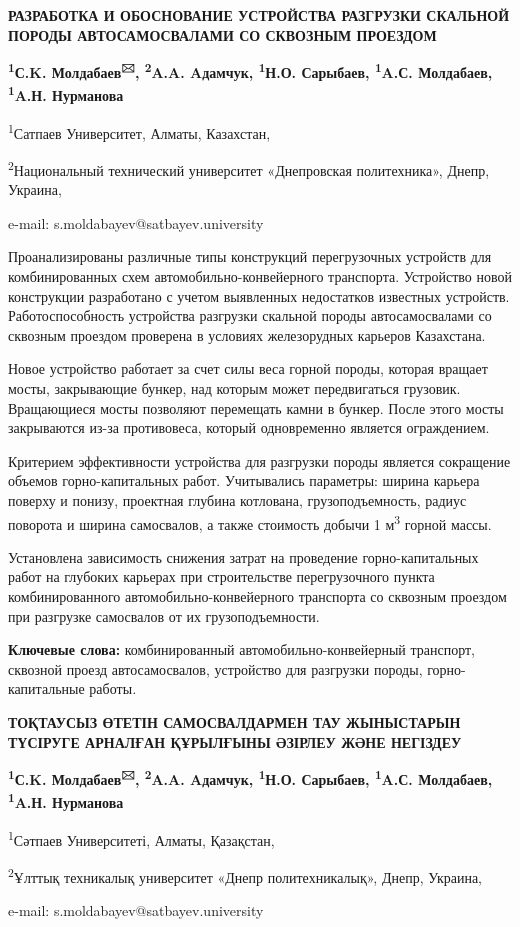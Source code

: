 \begin{center}
{\large\bfseries РАЗРАБОТКА И ОБОСНОВАНИЕ УСТРОЙСТВА РАЗГРУЗКИ СКАЛЬНОЙ ПОРОДЫ
АВТОСАМОСВАЛАМИ СО СКВОЗНЫМ ПРОЕЗДОМ}

{\bfseries \textsuperscript{1}С.K. Молдабаев\textsuperscript{🖂},
\textsuperscript{2}A.A. Aдамчук, \textsuperscript{1}Н.О. Сарыбаев,
\textsuperscript{1}A.С. Молдабаев, \textsuperscript{1}A.Н. Нурманова}

\textsuperscript{1}Сатпаев Университет, Алматы, Казахстан,

\textsuperscript{2}Национальный технический университет «Днепровская
политехника», Днепр, Украина,

e-mail: s.moldabayev@satbayev.university
\end{center}

Проанализированы различные типы конструкций перегрузочных устройств для
комбинированных схем автомобильно-конвейерного транспорта. Устройство
новой конструкции разработано с учетом выявленных недостатков известных
устройств. Работоспособность устройства разгрузки скальной породы
автосамосвалами со сквозным проездом проверена в условиях железорудных
карьеров Казахстана.

Новое устройство работает за счет силы веса горной породы, которая
вращает мосты, закрывающие бункер, над которым может передвигаться
грузовик. Вращающиеся мосты позволяют перемещать камни в бункер. После
этого мосты закрываются из-за противовеса, который одновременно является
ограждением.

Критерием эффективности устройства для разгрузки породы является
сокращение объемов горно-капитальных работ. Учитывались параметры:
ширина карьера поверху и понизу, проектная глубина котлована,
грузоподъемность, радиус поворота и ширина самосвалов, а также стоимость
добычи 1 м\textsuperscript{3} горной массы.

Установлена зависимость снижения затрат на проведение горно-капитальных
работ на глубоких карьерах при строительстве перегрузочного пункта
комбинированного автомобильно-конвейерного транспорта со сквозным
проездом при разгрузке самосвалов от их грузоподъемности.

{\bfseries Ключевые слова:} комбинированный автомобильно-конвейерный
транспорт, сквозной проезд автосамосвалов, устройство для разгрузки
породы, горно-капитальные работы\emph{.}

\begin{center}
{\large\bfseries ТОҚТАУСЫЗ ӨТЕТІН САМОСВАЛДАРМЕН ТАУ ЖЫНЫСТАРЫН ТҮСІРУГЕ АРНАЛҒАН
ҚҰРЫЛҒЫНЫ ӘЗІРЛЕУ ЖӘНЕ НЕГІЗДЕУ}

{\bfseries \textsuperscript{1}С.K. Молдабаев\textsuperscript{🖂},
\textsuperscript{2}A.A. Aдамчук, \textsuperscript{1}Н.О. Сарыбаев,
\textsuperscript{1}A.С. Молдабаев, \textsuperscript{1}A.Н. Нурманова}

\textsuperscript{1}Сәтпаев Университеті, Алматы, Қазақстан,

\textsuperscript{2}Ұлттық техникалық университет «Днепр политехникалық»,
Днепр, Украина,

e-mail: s.moldabayev@satbayev.university
\end{center}

